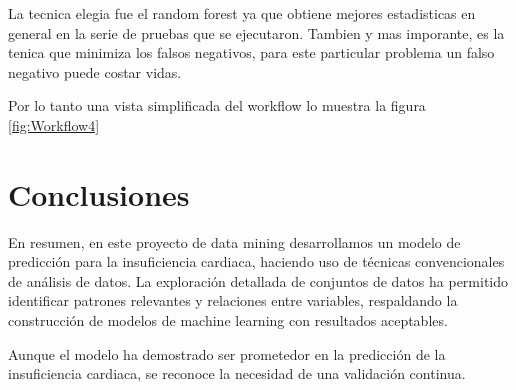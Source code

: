 \documentclass[12pt, letterpaper]{article}
\begin{document}
La tecnica elegia fue el random forest ya que obtiene mejores estadisticas en general 
en la serie de pruebas que se ejecutaron. Tambien y mas imporante, es la tenica que 
minimiza los falsos negativos, para este particular problema un falso negativo puede costar vidas.


Por lo tanto una vista simplificada del workflow lo muestra la figura \ref{fig:Workflow4}

\section{Conclusiones}
En resumen, en este proyecto de data mining desarrollamos un modelo de predicción 
para la insuficiencia cardiaca, haciendo uso de técnicas convencionales de análisis de datos. 
La exploración detallada de conjuntos de datos ha permitido identificar patrones relevantes y 
relaciones entre variables, respaldando la construcción de modelos de machine learning con 
resultados aceptables. 

Aunque el modelo ha demostrado ser prometedor en la predicción de la insuficiencia cardiaca, 
se reconoce la necesidad de una validación continua.

\newpage
\printbibliography
\end{document}
